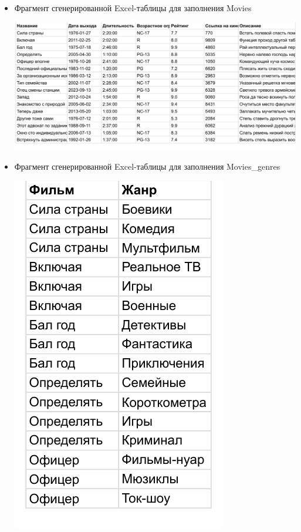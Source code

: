 \documentclass[a4paper,12pt]{article}
\renewcommand{\^}[2]{#1^{\, #2} \kern -1pt}
\newcommand{\1}{\kern 1pt}
\newcommand{\0}{\kern -1pt}
\begin{document}
	\begin{itemize}
	
	\item Фрагмент сгенерированной Excel-таблицы для заполнения Movies
	
	\includegraphics[scale=0.7,page=1]{table_inserts_excel/movies_random}
	

	\item Фрагмент сгенерированной Excel-таблицы для заполнения Movies\_genres
	
	\includegraphics[scale=0.7,page=1]{table_inserts_excel/movies_genres_random}
	


\end{itemize}
\end{document}

